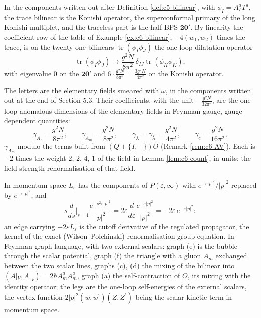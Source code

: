 \begin{remark}
In the components written out after Definition \ref{def:c5-bilinear}, with $\phi_I=A^a_IT^a$, the trace bilinear is the Konishi operator, the superconformal primary of the long Konishi multiplet, and the traceless part is the half-BPS $\mathbf{20'}$. By linearity the coefficient row of the table of Example \ref{ex:c6-bilinear}, $-4(w_1,w_2)$ times the trace, is on the twenty-one bilinears $\operatorname{tr}(\phi_I\phi_J)$ the one-loop dilatation operator
\[
\operatorname{tr}(\phi_I\phi_J)\longmapsto\frac{g^2N}{8\pi^2}\,\delta_{IJ}\operatorname{tr}(\phi_K\phi_K),
\]
with eigenvalue $0$ on the $\mathbf{20'}$ and $6\cdot\frac{g^2N}{8\pi^2}=\frac{3g^2N}{4\pi^2}$ on the Konishi operator.
\end{remark}

\begin{remark}
The letters are the elementary fields smeared with $\omega$, in the components written out at the end of Section 5.3. Their coefficients, with the unit $-\frac{g^2N}{32\pi^2}$, are the one-loop anomalous dimensions of the elementary fields in Feynman gauge, gauge-dependent quantities:
\[
\gamma_{A_I}=\frac{g^2N}{8\pi^2},\qquad \gamma_{A_m}=\frac{g^2N}{8\pi^2},\qquad \gamma_{\lambda}=\gamma_{\bar\lambda}=\frac{g^2N}{4\pi^2},\qquad \gamma_c=\frac{g^2N}{16\pi^2},
\]
$\gamma_{A_m}$ modulo the terms built from $(Q+\{I,-\})O$ (Remark \ref{rem:c6-AV}). Each is $-2$ times the weight $2$, $2$, $4$, $1$ of the field in Lemma \ref{lem:c6-count}, in units: the field-strength renormalisation of that field.
\end{remark}

\begin{remark}
In momentum space $L_\varepsilon$ has the components of $P(\varepsilon,\infty)$ with $e^{-\varepsilon|p|^2}/|p|^2$ replaced by $e^{-\varepsilon|p|^2}$, and
\[
s\frac{d}{ds}\Big|_{s=1}\frac{e^{-s^2\varepsilon|p|^2}}{|p|^2}=2\varepsilon\frac{d}{d\varepsilon}\frac{e^{-\varepsilon|p|^2}}{|p|^2}=-2\varepsilon\,e^{-\varepsilon|p|^2}:
\]
an edge carrying $-2\varepsilon L_\varepsilon$ is the cutoff derivative of the regulated propagator, the kernel of the exact (Wilson--Polchinski) renormalisation-group equation. In Feynman-graph language, with two external scalars: graph (e) is the bubble through the scalar potential, graph (f) the triangle with a gluon $A_m$ exchanged between the two scalar lines, graphs (c), (d) the mixing of the bilinear into $(A|_V,A|_V)=2\hbar A^a_mA^a_m$, graph (a) the self-contraction of $O$, its mixing with the identity operator; the legs are the one-loop self-energies of the external scalars, the vertex function $2|p|^2(w,w^{\prime})(Z,Z^{\prime})$ being the scalar kinetic term in momentum space.
\end{remark}

